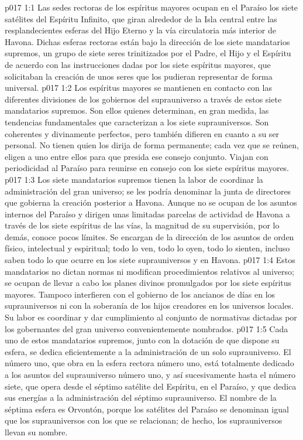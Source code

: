 \vs p017 1:1 Las sedes rectoras de los espíritus mayores ocupan en el Paraíso los siete satélites del Espíritu Infinito, que giran alrededor de la Isla central entre las resplandecientes esferas del Hijo Eterno y la vía circulatoria más interior de Havona. Dichas esferas rectoras están bajo la dirección de los siete mandatarios supremos, un grupo de siete seres trinitizados por el Padre, el Hijo y el Espíritu de acuerdo con las instrucciones dadas por los siete espíritus mayores, que solicitaban la creación de unos seres que los pudieran representar de forma universal.
\vs p017 1:2 Los espíritus mayores se mantienen en contacto con las diferentes divisiones de los gobiernos del suprauniverso a través de estos siete mandatarios supremos. Son ellos quienes determinan, en gran medida, las tendencias fundamentales que caracterizan a los siete suprauniversos. Son coherentes y divinamente perfectos, pero también difieren en cuanto a su ser personal. No tienen quien los dirija de forma permanente; cada vez que se reúnen, eligen a uno entre ellos para que presida ese consejo conjunto. Viajan con periodicidad al Paraíso para reunirse en consejo con los siete espíritus mayores.
\vs p017 1:3 \pc Los siete mandatarios supremos tienen la labor de coordinar la administración del gran universo; se les podría denominar la junta de directores que gobierna la creación posterior a Havona. Aunque no se ocupan de los asuntos internos del Paraíso y dirigen unas limitadas parcelas de actividad de Havona a través de los siete espíritus de las vías, la magnitud de su supervisión, por lo demás, conoce pocos límites. Se encargan de la dirección de los asuntos de orden físico, intelectual y espiritual; todo lo ven, todo lo oyen, todo lo sienten, incluso saben todo lo que ocurre en los siete suprauniversos y en Havona.
\vs p017 1:4 Estos mandatarios no dictan normas ni modifican procedimientos relativos al universo; se ocupan de llevar a cabo los planes divinos promulgados por los siete espíritus mayores. Tampoco interfieren con el gobierno de los ancianos de días en los suprauniversos ni con la soberanía de los hijos creadores en los universos locales. Su labor es coordinar y dar cumplimiento al conjunto de normativas dictadas por los gobernantes del gran universo convenientemente nombrados.
\vs p017 1:5 Cada uno de estos mandatarios supremos, junto con la dotación de que dispone su esfera, se dedica eficientemente a la administración de un solo suprauniverso. El número uno, que obra en la esfera rectora número uno, está totalmente dedicado a los asuntos del suprauniverso número uno, y así sucesivamente hasta el número siete, que opera desde el séptimo satélite del Espíritu, en el Paraíso, y que dedica sus energías a la administración del séptimo suprauniverso. El nombre de la séptima esfera es Orvontón, porque los satélites del Paraíso se denominan igual que los suprauniversos con los que se relacionan; de hecho, los suprauniversos llevan su nombre.
